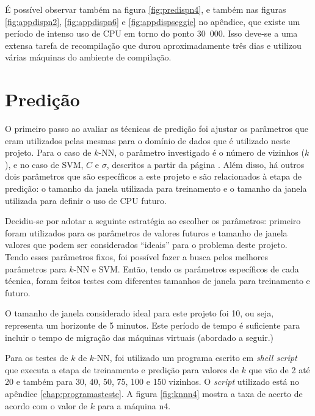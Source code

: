É possível observar também na figura \ref{fig:predispn4}, e também nas
figuras \ref{fig:appdispn2}, \ref{fig:appdispn6} e \ref{fig:appdispseggie} no
apêndice, que existe um período de intenso uso de CPU em torno do ponto
30~000. Isso deve-se a uma extensa tarefa de recompilação que durou
aproximadamente três dias e utilizou várias máquinas do ambiente de
compilação.

\section{Predição}

O primeiro passo ao avaliar as técnicas de predição foi ajustar os
parâmetros que eram utilizados pelas mesmas para o domínio de dados que é
utilizado neste projeto. Para o caso de $k$-NN, o parâmetro investigado é o
número de vizinhos ($k$), e no caso de SVM, $C$ e $\sigma$, descritos a
partir da página \pageref{sec:margenssuaves}. Além disso, há outros dois
parâmetros que são específicos a este projeto e são relacionados à etapa de
predição: o tamanho da janela utilizada para treinamento e o tamanho da
janela utilizada para definir o uso de CPU futuro.

Decidiu-se por adotar a seguinte estratégia ao escolher os parâmetros:
primeiro foram utilizados para os parâmetros de valores futuros e tamanho
de janela valores que podem ser considerados “ideais” para o problema deste
projeto. Tendo esses parâmetros fixos, foi possível fazer a busca pelos
melhores parâmetros para $k$-NN e SVM. Então, tendo os parâmetros
específicos de cada técnica, foram feitos testes com diferentes tamanhos de
janela para treinamento e futuro.


O tamanho de janela considerado ideal para este projeto foi 10, ou seja,
representa um horizonte de 5 minutos. Este período de tempo é suficiente
para incluir o tempo de migração das máquinas virtuais (abordado a seguir.)

Para os testes de $k$ de $k$-NN, foi utilizado um programa escrito em
\emph{shell script} que executa a etapa de treinamento e predição para
valores de $k$ que vão de 2 até 20 e também para 30, 40, 50, 75, 100 e 150
vizinhos. O \emph{script} utilizado está no apêndice \ref{chap:programasteste}. A
figura \ref{fig:knnn4} mostra a taxa de acerto de acordo com o valor de $k$
para a máquina n4.

